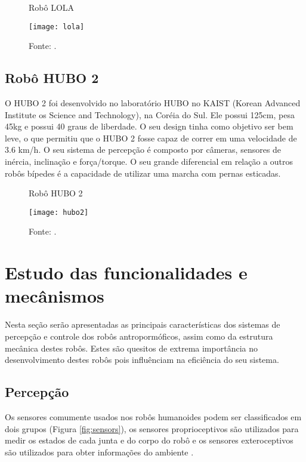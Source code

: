 \begin{figure} [H]
    \centering
    \caption{Robô LOLA}
    \texttt{[image: lola]}
    \caption*{Fonte: \cite{LOLAxx}.}
    \label{fig:lola}
\end{figure}

\subsection{Robô HUBO 2}
\label{ssec:hubo}

O HUBO 2 foi desenvolvido no laboratório HUBO no KAIST (Korean Advanced Institute os Science and Technology), na Coréia do Sul. Ele possui 125cm, pesa 45kg e possui 40 graus de liberdade. O seu design tinha como objetivo ser bem leve, o que permitiu que o HUBO 2 fosse capaz de correr em uma velocidade de 3.6 km/h. O seu sistema de percepção é composto por câmeras, sensores de inércia, inclinação e  força/torque. O seu grande diferencial em relação a outros robôs bípedes é a capacidade de utilizar uma marcha com pernas esticadas.

\begin{figure} [H]
    \centering
    \caption{Robô HUBO 2}
    \texttt{[image: hubo2]}
    \caption*{Fonte: \cite{HUBOxx}.}
    \label{fig:hubo2}
\end{figure}


\section{Estudo das funcionalidades e mecânismos}
\label{sec:robos}

Nesta seção serão apresentadas as principais características dos sistemas de percepção e controle dos robôs antropormóficos, assim como da estrutura mecânica destes robôs. Estes são quesitos de extrema importância no desenvolvimento destes robôs pois influênciam na eficiência do seu sistema.

\subsection{Percepção}
\label{ssec:percepcao}

Os sensores comumente usados nos robôs humanoides podem ser classificados em dois grupos (Figura \ref{fig:sensors}), os sensores proprioceptivos são utilizados para medir os estados de cada junta e do corpo do robô e os sensores exteroceptivos são utilizados para obter informações do ambiente \cite{He2020}.

